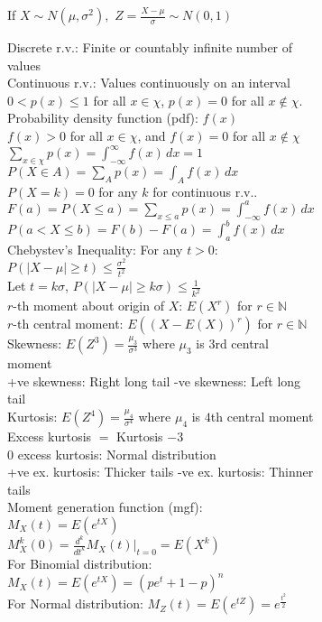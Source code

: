 \documentclass{article}
\begin{document}
\begin{figure}[h!]
\begin{subfigure}[h!]{0.49\textwidth}
        If $X\sim N(\mu,\sigma^{2}),$ $Z=\frac{X-\mu}{\sigma}\sim N(0,1)$
    \end{subfigure}
    \begin{subfigure}[h!]{0.49\textwidth}
        Discrete r.v.: Finite or countably infinite number of values\\
        Continuous r.v.: Values continuously on an interval\\
        $0<p(x)\leq 1$ for all $x\in\chi$, $p(x)=0$ for all $x\not\in\chi$.\\
        Probability density function (pdf): $f(x)$\\
        $f(x)>0$ for all $x\in\chi$, and $f(x)=0$ for all $x\not\in\chi$\\
        $\sum_{x\in\chi}p(x)=\int_{-\infty}^{\infty}f(x)\,dx=1$\\
        $P(X\in A)=\sum_{A}p(x)=\int_{A}f(x)\,dx$\\
        $P(X=k)=0$ for any $k$ for continuous r.v..\\
        $F(a)=P(X\leq a)=\sum_{x\leq a}p(x)=\int_{-\infty}^{a}f(x)\,dx$\\
        $P(a<X\leq b)=F(b)-F(a)=\int_{a}^{b}f(x)\,dx$\\
        Chebystev's Inequality: For any $t>0$: $P(\left|X-\mu\right|\geq t)\leq\frac{\sigma^{2}}{t^{2}}$\\
        Let $t=k\sigma$, $P(\left|X-\mu\right|\geq k\sigma)\leq\frac{1}{k^{2}}$\\
        $r$-th moment about origin of $X$: $E(X^{r})$ for $r\in\mathbb{N}$\\
        $r$-th central moment: $E((X-E(X))^{r})$ for $r\in\mathbb{N}$\\
        Skewness: $E(Z^{3})=\frac{\mu_{3}}{\sigma^{3}}$ where $\mu_{3}$ is $3$rd central moment\\
        +ve skewness: Right long tail \quad -ve skewness: Left long tail\\
        Kurtosis: $E(Z^{4})=\frac{\mu_{4}}{\sigma^{4}}$ where $\mu_{4}$ is $4$th central moment\\
        Excess kurtosis $=$ Kurtosis $-3$\\
        $0$ excess kurtosis: Normal distribution\\
        +ve ex. kurtosis: Thicker tails \quad -ve ex. kurtosis: Thinner tails\\
        Moment generation function (mgf): $M_{X}(t)=E(e^{tX})$\\
        $M_{X}^{k}(0)=\frac{d^{k}}{dt^{k}}M_{X}(t)\big\vert_{t=0}=E(X^{k})$\\
        For Binomial distribution: $M_{X}(t)=E(e^{tX})=(pe^{t}+1-p)^{n}$\\
        For Normal distribution: $M_{Z}(t)=E(e^{tZ})=e^{\frac{t^{2}}{2}}$
        \end{subfigure}
\end{figure}
\newpage
\end{document}
